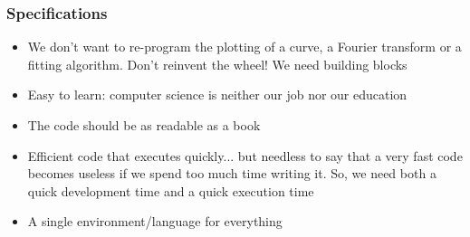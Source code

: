 \documentclass[colorlinks]{beamer}
\begin{document}
\begin{frame}[fragile]\frametitle{Specifications}
\small
  \begin{itemize}
    \item We don’t want to re-program the plotting of a curve, a Fourier transform or a fitting algorithm. Don’t reinvent the wheel! We need building blocks 
    \item Easy to learn: computer science is neither our job nor our education
    \item The code should be as readable as a book
    \item Efficient code that executes quickly... but needless to say that a very fast code becomes useless if we spend too much time writing it. So, we need both a quick development time and a quick execution time
    \item A single environment/language for everything
\end{itemize}

\end{frame}
\end{document}
